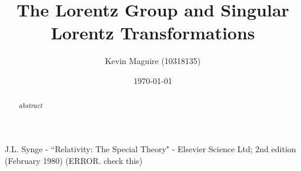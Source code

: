\documentclass[floatfix,aps,prd,amsmath,amssymb]{revtex4}
\begin{document}
\title{The Lorentz Group and Singular Lorentz Transformations}
\author{Kevin Maguire (10318135)}
\date{\today}

\begin{abstract}
\textit{abstract}
\end{abstract}

\maketitle
{}


\newpage

\tableofcontents

\newpage









 






\begin{thebibliography}{10}
  J.L. Synge - ``Relativity: The Special Theory" - Elsevier Science Ltd; 2nd edition (February 1980) (ERROR. check this) 
\end{thebibliography}
\end{document}
